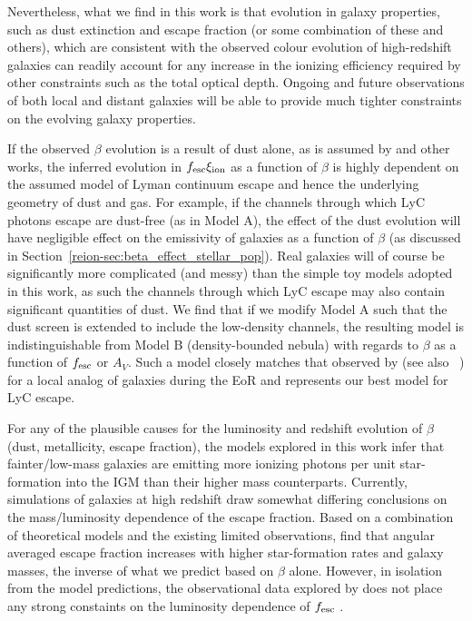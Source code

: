 Nevertheless, what we find in this work is that evolution in galaxy properties, such as dust extinction and escape fraction (or some combination of these and others), which are consistent with the observed colour evolution of high-redshift galaxies can readily account for any increase in the ionizing efficiency required by other constraints such as the total optical depth. Ongoing and future observations of both local and distant galaxies will be able to provide much tighter constraints on the evolving galaxy properties.

If the observed $\beta$ evolution is a result of dust alone, as is assumed by \citet{2012ApJ...754...83B} and other works, the inferred evolution in $f_{\rm{esc}}\xi_{\rm{ion}}$ as a function of $\beta$ is highly dependent on the assumed model of Lyman continuum escape and hence the underlying geometry of dust and gas. For example, if the channels through which LyC photons escape are dust-free (as in Model A),  the effect of the dust evolution will have negligible effect on the emissivity of galaxies as a function of $\beta$ (as discussed in Section~\ref{reion-sec:beta_effect_stellar_pop}). Real galaxies will of course be significantly more complicated (and messy) than the simple toy models adopted in this work, as such the channels through which LyC escape may also contain significant quantities of dust.  We find that if we modify Model A such that the dust screen is extended to include the low-density channels, the resulting model is indistinguishable from Model B (density-bounded nebula) with regards to $\beta$ as a function of $f_{\rm{esc}}$ or $A_{V}$. Such a model closely matches that observed by \citet{Borthakur:2014bz} (see also \citeauthor{Heckman:2011ju}~\citeyear{Heckman:2011ju}) for a local analog of galaxies during the EoR and represents our best model for LyC escape. 

For any of the plausible causes for the luminosity and redshift evolution of $\beta$ (dust, metallicity, escape fraction), the models explored in this work infer that fainter/low-mass galaxies are emitting more ionizing photons per unit star-formation into the IGM than their higher mass counterparts. Currently, simulations of galaxies at high redshift draw somewhat differing conclusions on the mass/luminosity dependence of the escape fraction. Based on a combination of theoretical models and the existing limited observations, \citet{Gnedin:2008ib} find that angular averaged escape fraction increases with higher star-formation rates and galaxy masses, the inverse of what we predict based on $\beta$ alone. However, in isolation from the model predictions, the observational data explored by \citet{Gnedin:2008ib} does not place any strong constaints on the luminosity dependence of $f_{\rm{esc}}$ \citep{Giallongo:2002hi,FernandezSoto:2003ev,Shapley:2006cq}.

